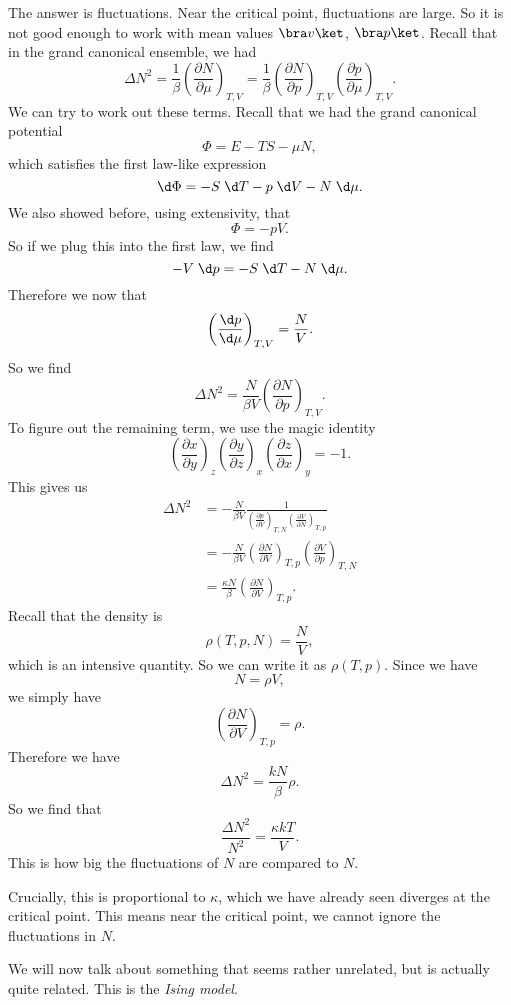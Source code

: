 \documentclass[a4paper]{article}
\begin{document}
The answer is fluctuations. Near the critical point, fluctuations are large. So it is not good enough to work with mean values $\bra v\ket$, $\bra p \ket$. Recall that in the grand canonical ensemble, we had
\[
  \Delta N^2 = \frac{1}{\beta} \left(\frac{\partial N}{\partial \mu}\right)_{T, V} = \frac{1}{\beta} \left(\frac{\partial N}{\partial p}\right)_{T, V} \left(\frac{\partial p}{\partial \mu}\right)_{T, V}.
\]
We can try to work out these terms. Recall that we had the grand canonical potential
\[
  \Phi = E - TS - \mu N,
\]
which satisfies the first law-like expression
\[
  \d \Phi = - S\;\d T - p\;\d V - N \;\d \mu.
\]
We also showed before, using extensivity, that
\[
  \Phi = - p V.
\]
So if we plug this into the first law, we find
\[
  -V \;\d p = - S\;\d T - N \;\d \mu.
\]
Therefore we now that
\[
  \left(\frac{\d p}{\d \mu}\right)_{T, V} = \frac{N}{V}.
\]
So we find
\[
  \Delta N^2 = \frac{N}{\beta V} \left(\frac{\partial N}{\partial p}\right)_{T, V}.
\]
To figure out the remaining term, we use the magic identity
\[
  \left(\frac{\partial x}{\partial y}\right)_z \left(\frac{\partial y}{\partial z}\right)_x \left(\frac{\partial z}{\partial x}\right)_y = -1.
\]
This gives us
\begin{align*}
  \Delta N^2 &=- \frac{N}{\beta V} \frac{1}{ \left(\frac{\partial p}{\partial V}\right)_{T, N} \left(\frac{\partial V}{\partial N}\right)_{T, p}} \\
  &= -\frac{N}{\beta V}\left(\frac{\partial N}{\partial V}\right)_{T, p} \left(\frac{\partial V}{\partial p}\right)_{T, N}\\
  &= \frac{\kappa N}{\beta}\left(\frac{\partial N}{\partial V}\right)_{T, p}.
\end{align*}
Recall that the density is
\[
  \rho (T, p, N) = \frac{N}{V},
\]
which is an intensive quantity. So we can write it as $\rho(T, p)$. Since we have
\[
  N = \rho V,
\]
we simply have
\[
  \left(\frac{\partial N}{\partial V}\right)_{T, p} = \rho.
\]
Therefore we have
\[
  \Delta N^2 = \frac{k N}{\beta} \rho.
\]
So we find that
\[
  \frac{\Delta N^2}{N^2} = \frac{\kappa kT}{V}.
\]
This is how big the fluctuations of $N$ are compared to $N$.

Crucially, this is proportional to $\kappa$, which we have already seen diverges at the critical point. This means near the critical point, we cannot ignore the fluctuations in $N$.

We will now talk about something that seems rather unrelated, but is actually quite related. This is the \emph{Ising model}.
\end{document}
